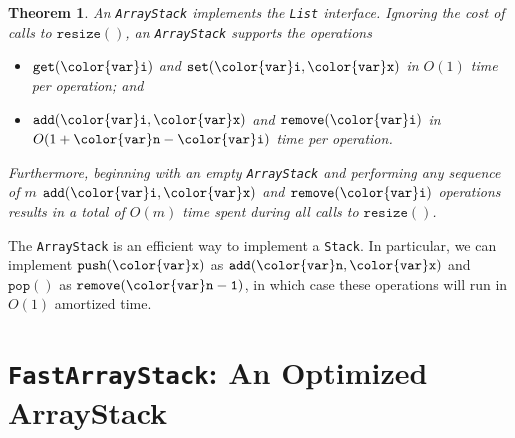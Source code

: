 \documentclass[10pt]{book}
\newcommand{\seclabel}[1]{\label{sec:#1}}
\theoremstyle{plain}
\newtheorem{thm}{Theorem}[chapter]
\newcommand{\thmlabel}[1]{\label{thm:#1}}
\theoremstyle{definition}
\begin{document}
\begin{thm}\thmlabel{arraystack}
  An \texttt{ArrayStack} implements the \texttt{List} interface.  Ignoring the cost of
  calls to \ensuremath{\mathtt{resize()}}, an \texttt{ArrayStack} supports the operations
  \begin{itemize}
    \item \ensuremath{\mathtt{get({\color{var}i})}} and \ensuremath{\mathtt{set({\color{var}i},{\color{var}x})}} in $O(1)$ time per operation; and
    \item \ensuremath{\mathtt{add({\color{var}i},{\color{var}x})}} and \ensuremath{\mathtt{remove({\color{var}i})}} in $O(1+\ensuremath{\mathtt{{\color{var}n}}}-\ensuremath{\mathtt{{\color{var}i}}})$ time per operation.
  \end{itemize}
  Furthermore, beginning with an empty \texttt{ArrayStack} and performing any
  sequence of $m$ \ensuremath{\mathtt{add({\color{var}i},{\color{var}x})}} and \ensuremath{\mathtt{remove({\color{var}i})}} operations results in a
  total of $O(m)$ time spent during all calls to \ensuremath{\mathtt{resize()}}.
\end{thm}

The \texttt{ArrayStack} is an efficient way to implement a \texttt{Stack}.
In particular, we can implement \ensuremath{\mathtt{push({\color{var}x})}} as \ensuremath{\mathtt{add({\color{var}n},{\color{var}x})}} and \ensuremath{\mathtt{pop()}}
as \ensuremath{\mathtt{remove({\color{var}n}-1)}}, in which case these operations will run in $O(1)$
amortized time.

\section{\texttt{FastArrayStack}: An Optimized ArrayStack}
\seclabel{fastarraystack}
\end{document}
